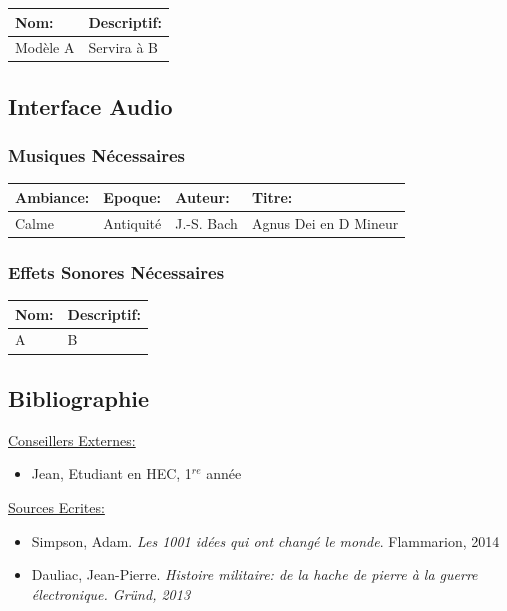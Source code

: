 \documentclass{article}
\begin{document}
            \begin{tabular}{|l|l|} \hline
                Nom: & Descriptif: \\ \hline \hline
                Modèle A & Servira à B \\ \hline
            \end{tabular}

    \subsection{Interface Audio}

        \subsubsection{Musiques Nécessaires}

            \begin{tabular}{|l|l|l|l|} \hline
                Ambiance: & Epoque: & Auteur: & Titre:\\ \hline \hline
                Calme & Antiquité & J.-S. Bach & Agnus Dei en D Mineur\\ \hline
            \end{tabular}

        \subsubsection{Effets Sonores Nécessaires}

            \begin{tabular}{|l|l|} \hline
                Nom: & Descriptif: \\ \hline \hline
                A & B\\ \hline
            \end{tabular}

    \subsection{Bibliographie}

        \underline{Conseillers Externes:}
            \begin{itemize}
                \item Jean, Etudiant en HEC, 1$^{re}$ année
            \end{itemize}

        \underline{Sources Ecrites:}
           \begin{itemize}
               \item Simpson, Adam. \textit{Les 1001 idées qui ont changé le monde}. Flammarion, 2014
               \item Dauliac, Jean-Pierre. \textit{Histoire militaire: de la hache de pierre à la guerre électronique. Gründ, 2013}
           \end{itemize} 
\end{document}
